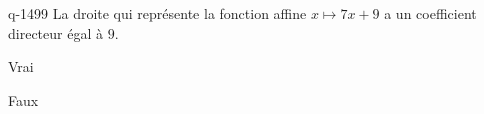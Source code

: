 \begin{truefalse}{q-1499}
La droite qui représente la fonction affine $x\mapsto 7x+9$ a un coefficient directeur égal à $9$.
\item Vrai
\item* Faux
\end{truefalse}

